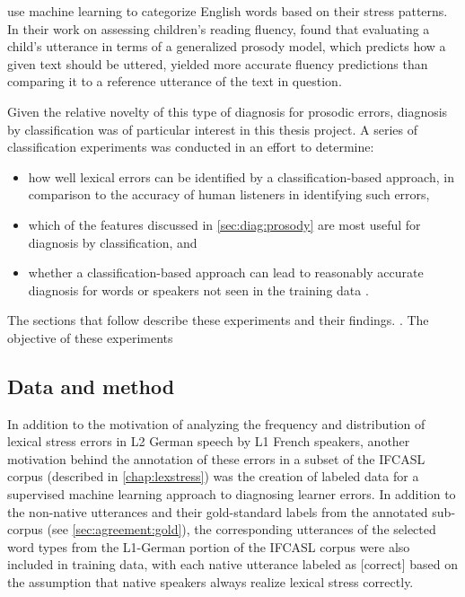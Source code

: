 	\textcite{Shahin2012a,Kim2011} use machine learning to categorize English words based on their stress patterns.
	 In their work on assessing children's reading fluency, \textcite{Duong2011} found that evaluating a child's utterance in terms of a generalized prosody model, which predicts how a given text should be uttered, yielded more accurate fluency predictions than comparing it to a reference utterance of the text in question. 
	 
	 
	 Given the relative novelty of this type of diagnosis for prosodic errors, diagnosis by classification was of particular interest in this thesis project. A series of classification experiments was conducted in an effort to determine:
	 \begin{itemize}
	 \item how well lexical errors can be identified by a classification-based approach, in comparison to the accuracy of human listeners in identifying such errors, 
	 \item which of the features discussed in \cref{sec:diag:prosody} are most useful for diagnosis by classification, and
	 \item whether a classification-based approach can lead to reasonably accurate diagnosis for words or speakers not seen in the training data .
	 \end{itemize}
	 The sections that follow describe these experiments and their findings. . 
	 The objective of these experiments 
	 
	\subsection{Data and method}
	\label{sec:classification:datamethod}
		
		In addition to the motivation of analyzing the frequency and distribution of lexical stress errors in L2 German speech by L1 French speakers, another motivation behind the annotation of these errors in a subset of the IFCASL corpus (described in \cref{chap:lexstress}) was the creation of labeled data for a supervised machine learning approach to diagnosing learner errors. In addition to the non-native utterances and their gold-standard labels from the annotated sub-corpus (see \cref{sec:agreement:gold}), the corresponding utterances of the selected word types from the L1-German portion of the IFCASL corpus were also included in training data, with each native utterance labeled as [correct] based on the assumption that native speakers always realize lexical stress correctly.
		

